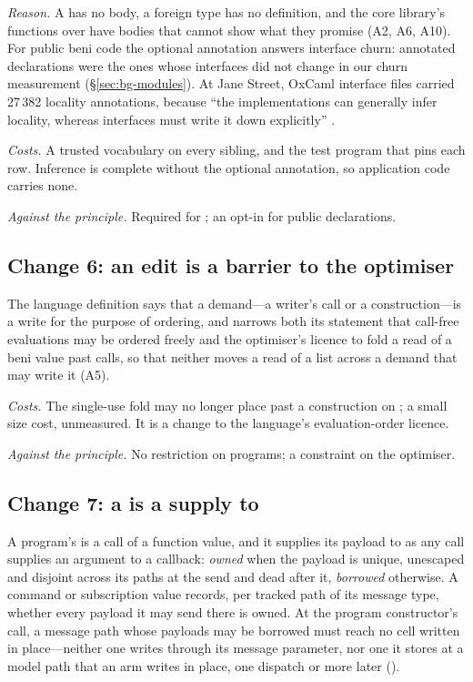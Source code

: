 \emph{Reason.} A  has no body, a foreign type has no definition, and the core library's
functions over  have bodies that cannot show what they promise (A2, A6, A10). For public beni code
the optional annotation answers interface churn: annotated declarations were the ones whose interfaces did
not change in our churn measurement (\S\ref{sec:bg-modules}). At Jane Street, OxCaml interface files
carried 27\,382 locality annotations, because ``the implementations can generally infer locality, whereas
interfaces must write it down explicitly'' \citep[\S7]{lorenzen2024oxidizing}.

\emph{Costs.} A trusted vocabulary on every sibling, and the test program that pins each row. Inference is
complete without the optional annotation, so application code carries none.

\emph{Against the principle.} Required for ; an opt-in for public declarations.

\subsection*{Change 6: an edit is a barrier to the optimiser}

The language definition says that a demand---a writer's call or a construction---is a write for the
purpose of ordering, and narrows both its statement that call-free evaluations may be ordered freely and
the optimiser's licence to fold a read of a beni value past calls, so that neither moves a read of a list
across a demand that may write it (A5).

\emph{Costs.} The single-use fold may no longer place  past a construction on ; a
small size cost, unmeasured. It is a change to the language's evaluation-order licence.

\emph{Against the principle.} No restriction on programs; a constraint on the optimiser.

\subsection*{Change 7: a  is a supply to }

A program's  is a call of a function value, and it supplies its payload to  as any
call supplies an argument to a callback: \emph{owned} when the payload is unique, unescaped and disjoint
across its paths at the send and dead after it, \emph{borrowed} otherwise. A command or subscription value
records, per tracked path of its message type, whether every payload it may send there is owned. At the
program constructor's call, a message path whose payloads may be borrowed must reach no cell written in
place---neither one  writes through its message parameter, nor one it stores at a model path
that an arm writes in place, one dispatch or more later ().

